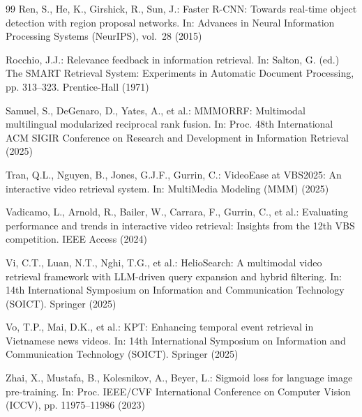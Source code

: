 \documentclass[runningheads]{llncs}
\begin{document}
\begin{thebibliography}{99}
Ren, S., He, K., Girshick, R., Sun, J.: Faster R-CNN: Towards real-time object detection with region proposal networks. In: Advances in Neural Information Processing Systems (NeurIPS), vol.~28 (2015)

Rocchio, J.J.: Relevance feedback in information retrieval. In: Salton, G. (ed.) The SMART Retrieval System: Experiments in Automatic Document Processing, pp. 313--323. Prentice-Hall (1971)

Samuel, S., DeGenaro, D., Yates, A., et al.: MMMORRF: Multimodal multilingual modularized reciprocal rank fusion. In: Proc. 48th International ACM SIGIR Conference on Research and Development in Information Retrieval (2025)

Tran, Q.L., Nguyen, B., Jones, G.J.F., Gurrin, C.: VideoEase at VBS2025: An interactive video retrieval system. In: MultiMedia Modeling (MMM) (2025)

Vadicamo, L., Arnold, R., Bailer, W., Carrara, F., Gurrin, C., et al.: Evaluating performance and trends in interactive video retrieval: Insights from the 12th VBS competition. IEEE Access (2024)

Vi, C.T., Luan, N.T., Nghi, T.G., et al.: HelioSearch: A multimodal video retrieval framework with LLM-driven query expansion and hybrid filtering. In: 14th International Symposium on Information and Communication Technology (SOICT). Springer (2025)

Vo, T.P., Mai, D.K., et al.: KPT: Enhancing temporal event retrieval in Vietnamese news videos. In: 14th International Symposium on Information and Communication Technology (SOICT). Springer (2025)

Zhai, X., Mustafa, B., Kolesnikov, A., Beyer, L.: Sigmoid loss for language image pre-training. In: Proc. IEEE/CVF International Conference on Computer Vision (ICCV), pp. 11975--11986 (2023)
\end{thebibliography}
\end{document}

